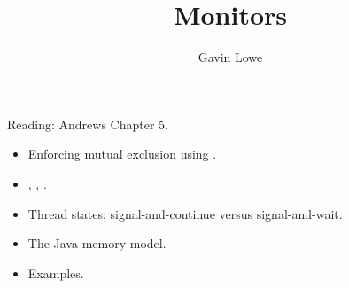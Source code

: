 \documentclass[notes,color]{sepslide0}
\title{Monitors}
\author{Gavin Lowe}
\begin{document}
\begin{slide}
  
  \Title

Reading: Andrews Chapter 5.
\end{slide}










\begin{slide}

\begin{itemize}
\item 
Enforcing mutual exclusion using .


\item
{}, , .

\item
Thread states; signal-and-continue versus signal-and-wait.

\item
The Java memory model.

\item
Examples.
\end{itemize}

\end{slide}
\end{document}
